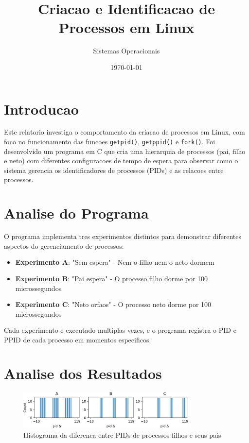 \documentclass[12pt]{article}
\title{Criacao e Identificacao de Processos em Linux}
\author{Sistemas Operacionais}
\date{\today}
\begin{document}
\maketitle

\section{Introducao}

Este relatorio investiga o comportamento da criacao de processos em Linux, com foco no funcionamento das funcoes \texttt{getpid()}, \texttt{getppid()} e \texttt{fork()}. Foi desenvolvido um programa em C que cria uma hierarquia de processos (pai, filho e neto) com diferentes configuracoes de tempo de espera para observar como o sistema gerencia os identificadores de processos (PIDs) e as relacoes entre processos.

\section{Analise do Programa}

O programa implementa tres experimentos distintos para demonstrar diferentes aspectos do gerenciamento de processos:

\begin{itemize}
    \item \textbf{Experimento A}: "Sem espera" - Nem o filho nem o neto dormem
    \item \textbf{Experimento B}: "Pai espera" - O processo filho dorme por 100 microssegundos
    \item \textbf{Experimento C}: "Neto orfaos" - O processo neto dorme por 100 microssegundos
\end{itemize}

Cada experimento e executado multiplas vezes, e o programa registra o PID e PPID de cada processo em momentos especificos.

\section{Analise dos Resultados}

\begin{figure}[h]
    \centering
    \includegraphics[width=0.8\textwidth]{figures/delta_histogram.png}
    \caption{Histograma da diferenca entre PIDs de processos filhos e seus pais}
    \label{fig:delta_histogram}
\end{figure}
\end{document}
